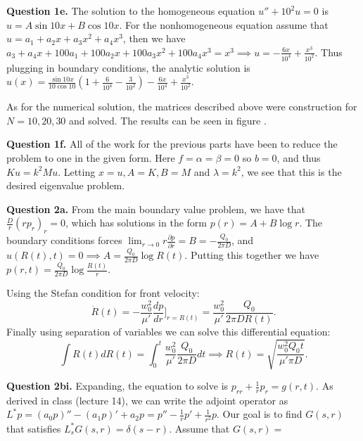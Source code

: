 \documentclass[letterpaper, reqno,11pt]{article}
\begin{document}
{\medskip\noindent\bf Question 1e.} The solution to the homogeneous equation $u''+10^2u=0$ is $u=A\sin 10x+B\cos 10x$. For the nonhomogeneous equation assume that $u=a_1+a_2x+a_3x^2+a_4x^{3}$, then we have $a_3+a_4x+100a_1+100a_2x+100a_3x^2+100a_4x^{3}=x^{3}\implies u=-\frac{6x}{10^{4}}+\frac{x^{3}}{10^2}$. Thus plugging in boundary conditions, the analytic solution is $u(x)=\frac{\sin 10x}{10\cos 10}\left(1+\frac{6}{10^{4}}-\frac{3}{10^2}\right)-\frac{6x}{10^{4}}+\frac{x^{3}}{10^2}$.

As for the numerical solution, the matrices described above were construction for $N=10,20,30$ and solved. The results can be seen in figure .

{\medskip\noindent\bf Question 1f.} All of the work for the previous parts have been to reduce the problem to one in the given form. Here $f=\alpha=\beta=0$ so $b=0$, and thus $Ku=k^2Mu$. Letting $x=u, A=K,B=M$ and $\lambda=k^2$, we see that this is the desired eigenvalue problem.

{\medskip\noindent\bf Question 2a.} From the main boundary value problem, we have that $\frac{D}{r}(rp_r)_r=0$, which has solutions in the form $p(r)=A+B\log r$. The boundary conditions forces $\lim_{r\to 0}r \frac{\partial p}{\partial r}=B=-\frac{Q_0}{2\pi D}$, and $u(R(t),t)=0\implies A=\frac{Q_0}{2\pi D}\log R(t)$. Putting this together we have $p(r,t)=\frac{Q_0}{2\pi D}\log \frac{R(t)}{r}$.

Using the Stefan condition for front velocity:
\[
\dot R(t)= -\frac{w_0^2}{\mu'}\frac{dp}{dr}\bigg]_{r=R(t)}=\frac{w_0^2}{\mu'}\frac{Q_0}{2\pi DR(t)}
.\]
Finally using separation of variables we can solve this differential equation:
\[
\int R(t)dR(t)=\int_0^{t}\frac{w_0^2}{\mu'}\frac{Q_0}{2\pi D}dt\implies R(t)=\sqrt{\frac{w_0^2Q_0t}{\mu'\pi D}}
.\]

{\medskip\noindent\bf Question 2bi.} Expanding, the equation to solve is $p_{rr}+\frac{1}{r}p_r=g(r,t)$. As derived in class (lecture 14), we can write the adjoint operator as $L^{*}p=(a_0p)''-(a_1p)'+a_2p=p''-\frac{1}{r}p'+\frac{1}{r^2}p$. Our goal is to find $G(s,r)$ that satisfies $L^{*}_s G(s,r)=\delta(s-r)$. Assume that $G(s,r)=$
\end{document}
